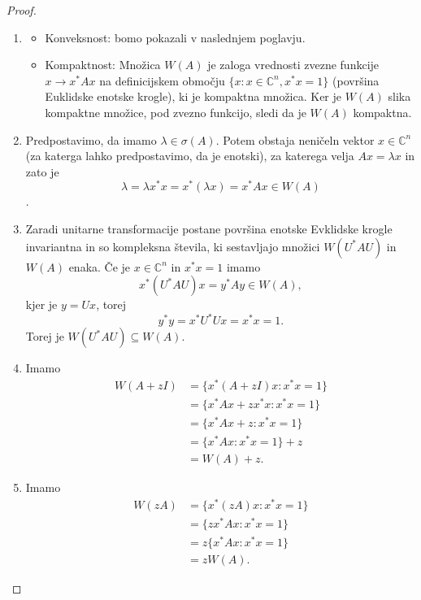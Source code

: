 \documentclass[12pt,a4paper]{amsart}
\theoremstyle{definition}
\theoremstyle{plain}
\newcommand{\C}{\mathbb C}
\begin{document}
\begin{proof}
\begin{enumerate}[1.]
\item
\begin{itemize}
\item Konveksnost: bomo pokazali v naslednjem poglavju.
\item Kompaktnost: Množica $W(A)$ je zaloga vrednosti zvezne funkcije $x \rightarrow x^\ast Ax$ na definicijskem območju $\{x:x\in \C^n , x^\ast x=1\}$ (površina Euklidske enotske krogle), ki je kompaktna množica. Ker je $W(A)$ slika kompaktne množice, pod zvezno funkcijo, sledi da je $W(A)$ kompaktna.
\end{itemize}
\item Predpostavimo, da imamo $\lambda \in \sigma(A)$. Potem obstaja neničeln vektor $x\in \C ^n$ (za katerga lahko predpostavimo, da je enotski), za katerega velja $Ax=\lambda x$ in zato je
$$\lambda = \lambda x^\ast x=x^\ast (\lambda x) = x^\ast Ax \in W(A)$$.
\item Zaradi unitarne transformacije postane površina enotske Evklidske krogle invariantna in so kompleksna števila, ki sestavljajo množici $W(U^\ast AU)$ in $W(A)$ enaka. 
Če je $x\in \C^n$ in $x^\ast x=1$ imamo $$x^\ast (U^\ast AU)x=y^\ast Ay \in W(A),$$ kjer je $y = Ux$, torej $$y^\ast y=x^\ast U^\ast Ux=x^\ast x=1.$$ Torej je $W(U^\ast AU)\subseteq W(A)$. 

\item Imamo 
\begin{align*}
W(A +zI)&=\{x^\ast (A+zI)x: x^\ast x=1\}\\
& = \{x^\ast Ax + zx^\ast x: x^\ast x =1\}\\
 &= \{x^\ast Ax + z: x^\ast x=1\} \\
&= \{x^\ast Ax: x^\ast x=1\} +z \\
&= W(A) +z.
\end{align*}
\item Imamo 
\begin{align*}
W(zA) &= \{x^\ast (zA)x: x^\ast x=1\}\\
& = \{zx^\ast Ax:x^\ast x =1\}\\
&= z\{x^\ast Ax:x^\ast x=1\}\\
& = zW(A).
\end{align*}


\end{enumerate}
\end{proof}
\end{document}
